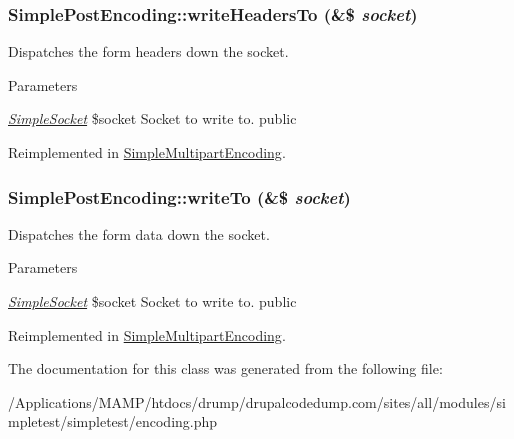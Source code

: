 \hypertarget{class_simple_post_encoding_a4e637e85bb8511a0b38e234388cb330b}{
\subsubsection[{writeHeadersTo}]{\setlength{\rightskip}{0pt plus 5cm}SimplePostEncoding::writeHeadersTo (\&\$ {\em socket})}}
\label{class_simple_post_encoding_a4e637e85bb8511a0b38e234388cb330b}
Dispatches the form headers down the socket. 
\begin{DoxyParams}{Parameters}
\item[{\em \hyperlink{class_simple_socket}{SimpleSocket}}]\$socket Socket to write to.  public \end{DoxyParams}


Reimplemented in \hyperlink{class_simple_multipart_encoding_a6b5cef09d6de499b8eec15bf81ac70fc}{SimpleMultipartEncoding}.\hypertarget{class_simple_post_encoding_a45d035ce0ffe9358dd7e30c657f2fa5e}{
\subsubsection[{writeTo}]{\setlength{\rightskip}{0pt plus 5cm}SimplePostEncoding::writeTo (\&\$ {\em socket})}}
\label{class_simple_post_encoding_a45d035ce0ffe9358dd7e30c657f2fa5e}
Dispatches the form data down the socket. 
\begin{DoxyParams}{Parameters}
\item[{\em \hyperlink{class_simple_socket}{SimpleSocket}}]\$socket Socket to write to.  public \end{DoxyParams}


Reimplemented in \hyperlink{class_simple_multipart_encoding_acaedbfc33a85c6db3ea616491b00442b}{SimpleMultipartEncoding}.

The documentation for this class was generated from the following file:\begin{DoxyCompactItemize}
\item 
/Applications/MAMP/htdocs/drump/drupalcodedump.com/sites/all/modules/simpletest/simpletest/encoding.php\end{DoxyCompactItemize}
